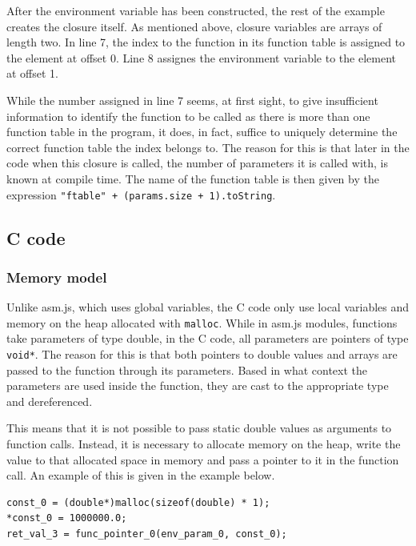 \documentclass[11pt]{report}
\begin{document}
After the environment variable has been constructed, the rest of the example creates the closure itself. As mentioned above, closure variables are arrays of length two. In line 7, the index to the function in its function table is assigned to the element at offset 0. Line 8 assignes the environment variable to the element at offset 1.

While the number assigned in line 7 seems, at first sight, to give insufficient information to identify the function to be called as there is more than one function table in the program, it does, in fact, suffice to uniquely determine the correct function table the index belongs to. The reason for this is that later in the code when this closure is called, the number of parameters it is called with, is known at compile time. The name of the function table is then given by the expression \texttt{"ftable" + (params.size + 1).toString}.

\subsection{C code}
\subsubsection{Memory model}
Unlike asm.js, which uses global variables, the C code only use local variables and memory on the heap allocated with \texttt{malloc}. While in asm.js modules, functions take parameters of type double, in the C code, all parameters are pointers of type \texttt{void*}. The reason for this is that both pointers to double values and arrays are passed to the function through its parameters. Based in what context the parameters are used inside the function, they are cast to the appropriate type and dereferenced.

This means that it is not possible to pass static double values as arguments to function calls. Instead, it is necessary to allocate memory on the heap, write the value to that allocated space in memory and pass a pointer to it in the function call. An example of this is given in the example below.

\begin{lstlisting}
const_0 = (double*)malloc(sizeof(double) * 1);
*const_0 = 1000000.0;
ret_val_3 = func_pointer_0(env_param_0, const_0);
\end{lstlisting}
\end{document}

